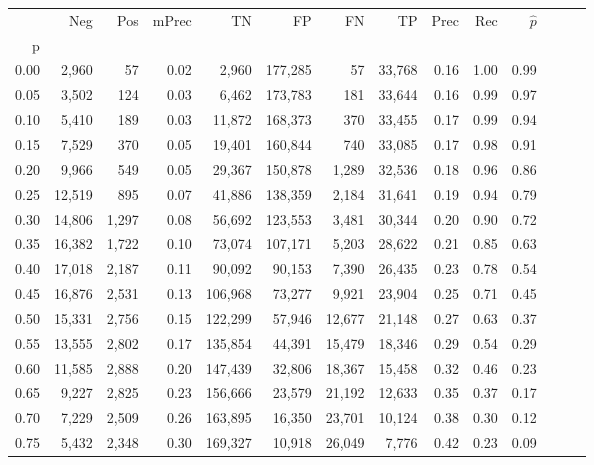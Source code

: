 \begin{tabular}{rrrrrrrrrrrrrr}
\toprule
{} &     Neg &    Pos & mPrec &       TN &       FP &      FN &      TP &  Prec &   Rec & $\hat{p}$ \\
p    &         &        &       &          &          &         &         &       &       &           \\
\midrule
0.00 &   2,960 &     57 &  0.02 &    2,960 &  177,285 &      57 &  33,768 &  0.16 &  1.00 &      0.99 \\
0.05 &   3,502 &    124 &  0.03 &    6,462 &  173,783 &     181 &  33,644 &  0.16 &  0.99 &      0.97 \\
0.10 &   5,410 &    189 &  0.03 &   11,872 &  168,373 &     370 &  33,455 &  0.17 &  0.99 &      0.94 \\
0.15 &   7,529 &    370 &  0.05 &   19,401 &  160,844 &     740 &  33,085 &  0.17 &  0.98 &      0.91 \\
0.20 &   9,966 &    549 &  0.05 &   29,367 &  150,878 &   1,289 &  32,536 &  0.18 &  0.96 &      0.86 \\
0.25 &  12,519 &    895 &  0.07 &   41,886 &  138,359 &   2,184 &  31,641 &  0.19 &  0.94 &      0.79 \\
0.30 &  14,806 &  1,297 &  0.08 &   56,692 &  123,553 &   3,481 &  30,344 &  0.20 &  0.90 &      0.72 \\
0.35 &  16,382 &  1,722 &  0.10 &   73,074 &  107,171 &   5,203 &  28,622 &  0.21 &  0.85 &      0.63 \\
0.40 &  17,018 &  2,187 &  0.11 &   90,092 &   90,153 &   7,390 &  26,435 &  0.23 &  0.78 &      0.54 \\
0.45 &  16,876 &  2,531 &  0.13 &  106,968 &   73,277 &   9,921 &  23,904 &  0.25 &  0.71 &      0.45 \\
0.50 &  15,331 &  2,756 &  0.15 &  122,299 &   57,946 &  12,677 &  21,148 &  0.27 &  0.63 &      0.37 \\
0.55 &  13,555 &  2,802 &  0.17 &  135,854 &   44,391 &  15,479 &  18,346 &  0.29 &  0.54 &      0.29 \\
0.60 &  11,585 &  2,888 &  0.20 &  147,439 &   32,806 &  18,367 &  15,458 &  0.32 &  0.46 &      0.23 \\
0.65 &   9,227 &  2,825 &  0.23 &  156,666 &   23,579 &  21,192 &  12,633 &  0.35 &  0.37 &      0.17 \\
0.70 &   7,229 &  2,509 &  0.26 &  163,895 &   16,350 &  23,701 &  10,124 &  0.38 &  0.30 &      0.12 \\
0.75 &   5,432 &  2,348 &  0.30 &  169,327 &   10,918 &  26,049 &   7,776 &  0.42 &  0.23 &      0.09 \\

\end{tabular}
